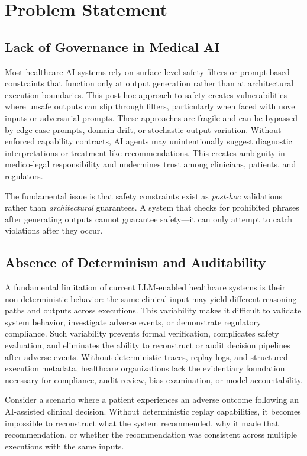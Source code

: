 \documentclass[conference]{IEEEtran}
\begin{document}
\section{Problem Statement}

\subsection{Lack of Governance in Medical AI}
Most healthcare AI systems rely on surface-level safety filters or prompt-based constraints that function only at output generation rather than at architectural execution boundaries. This post-hoc approach to safety creates vulnerabilities where unsafe outputs can slip through filters, particularly when faced with novel inputs or adversarial prompts. These approaches are fragile and can be bypassed by edge-case prompts, domain drift, or stochastic output variation. Without enforced capability contracts, AI agents may unintentionally suggest diagnostic interpretations or treatment-like recommendations. This creates ambiguity in medico-legal responsibility and undermines trust among clinicians, patients, and regulators.

The fundamental issue is that safety constraints exist as \textit{post-hoc} validations rather than \textit{architectural} guarantees. A system that checks for prohibited phrases after generating outputs cannot guarantee safety—it can only attempt to catch violations after they occur.

\subsection{Absence of Determinism and Auditability}
A fundamental limitation of current LLM-enabled healthcare systems is their non-deterministic behavior: the same clinical input may yield different reasoning paths and outputs across executions. This variability makes it difficult to validate system behavior, investigate adverse events, or demonstrate regulatory compliance. Such variability prevents formal verification, complicates safety evaluation, and eliminates the ability to reconstruct or audit decision pipelines after adverse events. Without deterministic traces, replay logs, and structured execution metadata, healthcare organizations lack the evidentiary foundation necessary for compliance, audit review, bias examination, or model accountability.

Consider a scenario where a patient experiences an adverse outcome following an AI-assisted clinical decision. Without deterministic replay capabilities, it becomes impossible to reconstruct what the system recommended, why it made that recommendation, or whether the recommendation was consistent across multiple executions with the same inputs.
\end{document}
